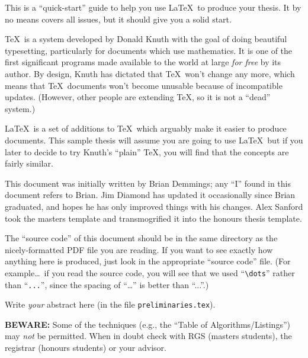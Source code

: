\tocAndSuch



This is a ``quick-start'' guide to help you use \LaTeX\ to produce
your thesis.  It by no means covers all issues, but it should give you
a solid start.

\TeX\ is a system developed by Donald Knuth with the goal of doing
beautiful typesetting, particularly for documents which use
mathematics.  It is one of the first significant programs made
available to the world at large \emph{for free} by its author.  By
design, Knuth has dictated that \TeX\ won't change any more, which
means that \TeX\ documents won't become unusable because of
incompatible updates.  (However, other people are extending \TeX, so
it is not a ``dead'' system.)

\LaTeX\ is a set of additions to \TeX\ which arguably make it easier
to produce documents.  This sample thesis will assume you are going to
use \LaTeX\, but if you later to decide to try Knuth's ``plain'' \TeX,
you will find that the concepts are fairly similar.

This document was initially written by Brian Demmings; any ``I'' found
in this document refers to Brian.  Jim Diamond has updated it
occasionally since Brian graduated, and hopes he has only improved
things with his changes.  Alex Sanford took the masters template and
transmogrified it into the honours thesis template.

The ``source code'' of this document should be in the same directory
as the nicely-formatted PDF file you are reading.  If you want to see
exactly how anything here is produced, just look in the appropriate
``source code'' file.  (For example\dots\ if you read the source code,
you will see that we used ``\verb|\dots|'' rather than ``\verb|...|'',
since the spacing of ``\dots'' is better than ``...''.)

\medskip

Write \emph{your} abstract here (in the file \verb|preliminaries.tex|).
		
\medskip

\textbf{BEWARE:} Some of the techniques (e.g., the ``Table of
Algorithms/Listings'') may \emph{not} be permitted.  When in doubt
check with RGS (masters students), the registrar (honours students) or
your advisor.



\afterpreface
